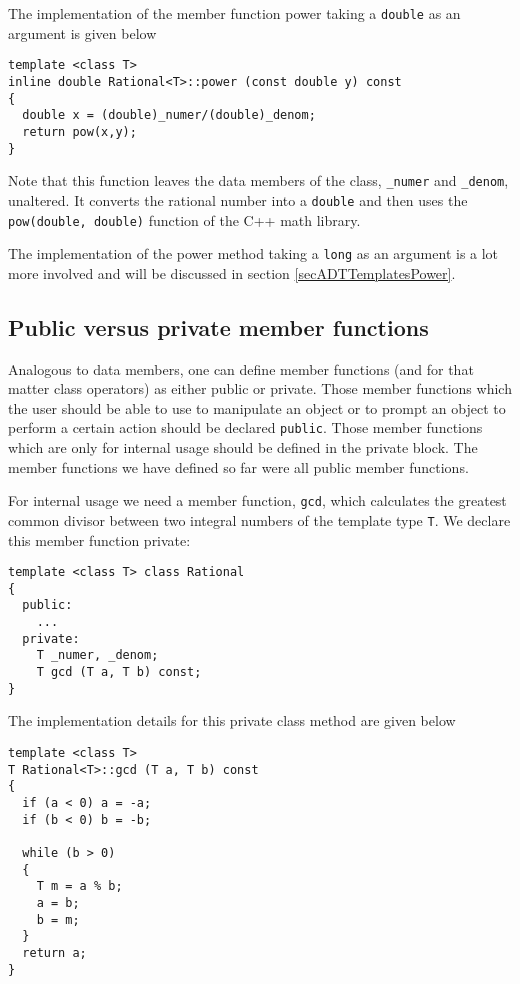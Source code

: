 The implementation of the member function power taking a \verb+double+
as an argument is given below
{\footnotesize \begin{verbatim}
template <class T>
inline double Rational<T>::power (const double y) const
{
  double x = (double)_numer/(double)_denom;
  return pow(x,y);
}
\end{verbatim}}
Note that this function leaves the data members of the class, \verb+_numer+
and \verb+_denom+, unaltered. It converts the rational number into a
\verb+double+ and then uses the \verb+pow(double, double)+ function
of the C++ math library.

The implementation of the power method taking a \verb+long+ as an
argument is a lot more involved and will be discussed in section 
\ref{secADTTemplatesPower}.


\subsection{Public versus private member functions}

Analogous to data members, one can define member functions 
(and for that matter class operators) as either public or private.
Those member functions which the user should be able to use
to manipulate an object or to prompt an object to perform a
certain action should be declared \verb+public+. Those member
functions which are only for internal usage should be defined
in the private block. The member functions we have defined so
far were all public member functions. 

For internal usage we need a member function, \verb+gcd+,  which 
calculates the greatest common divisor between two integral numbers
of the template type \verb+T+. We declare this member function
private:
{\footnotesize \begin{verbatim}
template <class T> class Rational
{
  public:
    ...
  private:
    T _numer, _denom;
    T gcd (T a, T b) const;
}
\end{verbatim}}
The implementation details for this private class method are given below
{\footnotesize \begin{verbatim}
template <class T>
T Rational<T>::gcd (T a, T b) const
{
  if (a < 0) a = -a;
  if (b < 0) b = -b;

  while (b > 0)
  {
    T m = a % b;
    a = b;
    b = m;
  }
  return a;
}
\end{verbatim}}

